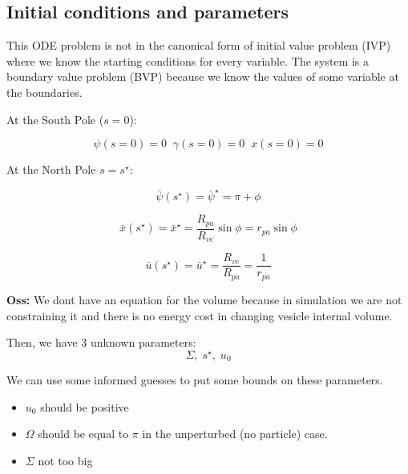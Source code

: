 \documentclass[12pt]{article}
\begin{document}




\subsection{Initial conditions and parameters}
This ODE problem is not in the canonical form of initial value problem (IVP) where we know the starting conditions for every variable. The system is a boundary value problem (BVP) because we know the values of some variable at the boundaries.

At the South Pole ($s=0$):


$$
\psi(s=0)=0 \; \; \gamma(s=0)=0 \; \; x(s=0) = 0
$$

At the North Pole $s=s^\star$:

$$
\bar{\psi}(s^\star) = \bar{\psi}^\star = \pi + \phi
$$


$$
\bar{x}(s^\star) = \bar{x}^\star =\frac{R_{pa}}{R_{ve}} \sin \phi = r_{pa} \sin \phi
$$

$$
\bar{u}(s^\star) = \bar{u}^\star = \frac{R_{ve}}{R_{pa}} = \frac{1}{r_{pa}}
$$




\textbf{Oss:} We dont have an equation for the volume because in simulation we are not constraining it and there is no energy cost in changing vesicle internal volume. 


Then, we have 3 unknown parameters:
$$\Sigma,\; s^\star ,\;u_0$$

We can use some informed guesses to put some bounds on these parameters. 
\begin{itemize}
  \item $u_0$ should be positive
  \item $\Omega$ should be equal to $\pi$ in the unperturbed (no particle) case.
  \item $\Sigma$ not too big
\end{itemize}
\end{document}
